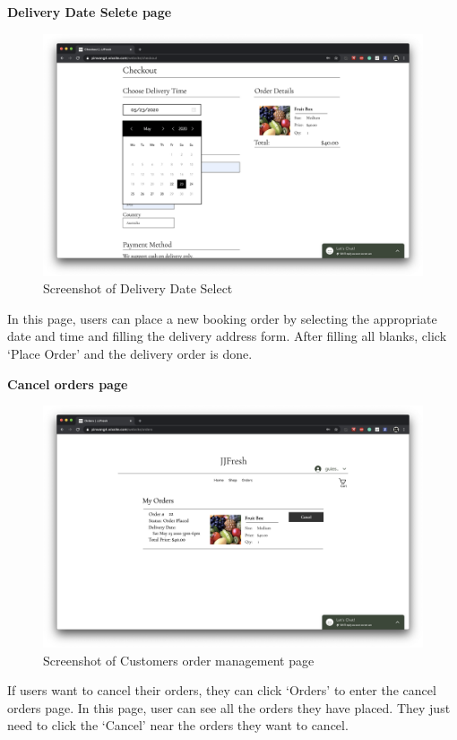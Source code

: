 \clearpage
\textbf{Delivery Date Selete page}
\begin{figure}[htp]
\centering
\includegraphics[width=\textwidth]{Figures/dateSelect.png}
\caption{Screenshot of Delivery Date Select}
\label{fig:dateSelect}
\end{figure}


In this page, users can place a new booking order by selecting the appropriate date and time and filling the delivery address form. After filling all blanks, click ‘Place Order’ and the delivery order is done.

\clearpage

\textbf{Cancel orders page}
\begin{figure}[htp]
\centering
\includegraphics[width=\textwidth]{Figures/customerOrder.png}
\caption{Screenshot of Customers order management page}
\label{fig:customerOrder}
\end{figure}

If users want to cancel their orders, they can click ‘Orders’ to enter the cancel orders page. In this page, user can see all the orders they have placed. They just need to click the ‘Cancel’ near the orders they want to cancel.

